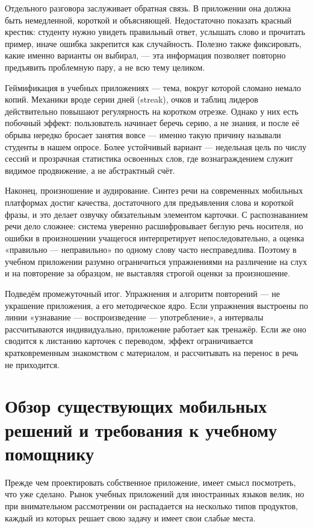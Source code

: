 \documentclass[11pt,a4paper,openany]{report}
\begin{document}
Отдельного разговора заслуживает обратная связь. В приложении она должна быть немедленной, короткой и объясняющей. Недостаточно показать красный крестик: студенту нужно увидеть правильный ответ, услышать слово и прочитать пример, иначе ошибка закрепится как случайность. Полезно также фиксировать, какие именно варианты он выбирал, — эта информация позволяет повторно предъявить проблемную пару, а не всю тему целиком.

Геймификация в учебных приложениях — тема, вокруг которой сломано немало копий. Механики вроде серии дней (streak), очков и таблиц лидеров действительно повышают регулярность на коротком отрезке. Однако у них есть побочный эффект: пользователь начинает беречь серию, а не знания, и после её обрыва нередко бросает занятия вовсе — именно такую причину называли студенты в нашем опросе. Более устойчивый вариант — недельная цель по числу сессий и прозрачная статистика освоенных слов, где вознаграждением служит видимое продвижение, а не абстрактный счёт.

Наконец, произношение и аудирование. Синтез речи на современных мобильных платформах достиг качества, достаточного для предъявления слова и короткой фразы, и это делает озвучку обязательным элементом карточки. С распознаванием речи дело сложнее: система уверенно расшифровывает беглую речь носителя, но ошибки в произношении учащегося интерпретирует непоследовательно, а оценка «правильно — неправильно» по одному слову часто несправедлива. Поэтому в учебном приложении разумно ограничиться упражнениями на различение на слух и на повторение за образцом, не выставляя строгой оценки за произношение.

Подведём промежуточный итог. Упражнения и алгоритм повторений — не украшение приложения, а его методическое ядро. Если упражнения выстроены по линии «узнавание — воспроизведение — употребление», а интервалы рассчитываются индивидуально, приложение работает как тренажёр. Если же оно сводится к листанию карточек с переводом, эффект ограничивается кратковременным знакомством с материалом, и рассчитывать на перенос в речь не приходится.

\section{Обзор существующих мобильных решений и требования к учебному помощнику}

Прежде чем проектировать собственное приложение, имеет смысл посмотреть, что уже сделано. Рынок учебных приложений для иностранных языков велик, но при внимательном рассмотрении он распадается на несколько типов продуктов, каждый из которых решает свою задачу и имеет свои слабые места.
\end{document}
